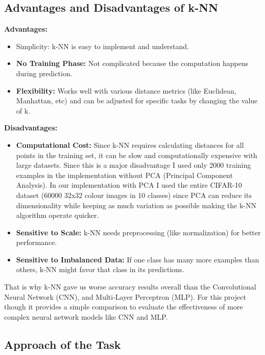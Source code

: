 \documentclass[lettersize,journal]{IEEEtran}
\begin{document}
\subsection{\textbf{Advantages and Disadvantages of k-NN}}

\textbf{Advantages:}
\begin{itemize}
    \item \textbf{}{Simplicity:} k-NN is easy to implement and understand.
    \item \textbf{No Training Phase:} Not complicated because the computation happens during prediction.
    \item \textbf{Flexibility:} Works well with various distance metrics (like Euclidean, Manhattan, etc) and can be adjusted for specific tasks by changing the value of k.
\end{itemize}

\textbf{Disadvantages:}
\begin{itemize}
    \item \textbf{Computational Cost:} Since k-NN requires calculating distances for all points in the training set, it can be slow and computationally expensive with large datasets. Since this is a major disadvantage I used only 2000 training examples in the implementation without PCA (Principal Component Analysis). In our implementation with PCA I used the entire CIFAR-10 dataset (60000 32x32 colour images in 10 classes) since PCA can reduce its dimensionality while keeping as much variation as possible making the k-NN algorithm operate quicker.
    \item \textbf{Sensitive to Scale:} k-NN needs preprocessing (like normalization) for better performance.
    \item \textbf{Sensitive to Imbalanced Data:} If one class has many more examples than others, k-NN might favor that class in its predictions.
\end{itemize}
\vspace{0.3cm}

That is why k-NN gave us worse accuracy results overall than the Convolutional Neural Network (CNN), and Multi-Layer Perceptron (MLP).
For this project though it provides a simple comparison to evaluate the effectiveness of more complex neural network models like CNN and MLP.

\subsection{\textbf{Approach of the Task}}
\end{document}
